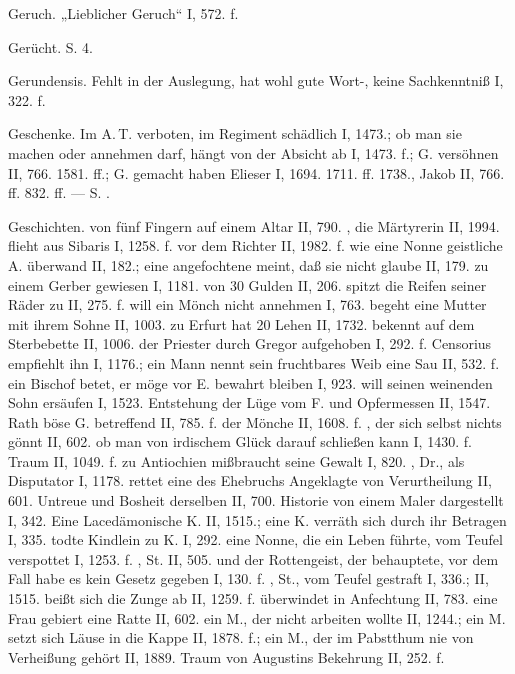 Geruch. „Lieblicher Geruch“ I, 572. f.

Gerücht. S.  4.

Gerundensis. Fehlt in der Auslegung, hat wohl gute Wort-, keine Sachkenntniß I, 322. f.

Geschenke. Im A.\,T. verboten, im Regiment schädlich I, 1473.; ob man sie machen oder annehmen darf, hängt von der Absicht ab I, 1473. f.; G. versöhnen II, 766. 1581. ff.; G. gemacht haben Elieser I, 1694. 1711. ff. 1738., Jakob II, 766. ff. 832. ff. — S. .

Geschichten.  von fünf Fingern auf einem Altar II, 790. , die Märtyrerin II, 1994.  flieht aus Sibaris I, 1258. f.  vor dem Richter II, 1982. f.  wie eine Nonne geistliche A. überwand II, 182.; eine angefochtene meint, daß sie nicht glaube II, 179.  zu einem Gerber gewiesen I, 1181.  von 30 Gulden II, 206.  spitzt die Reifen seiner Räder zu II, 275. f.  will ein Mönch nicht annehmen I, 763.  begeht eine Mutter mit ihrem Sohne II, 1003.  zu Erfurt hat 20 Lehen II, 1732.  bekennt auf dem Sterbebette II, 1006.  der Priester durch Gregor aufgehoben I, 292. f.  Censorius empfiehlt ihn I, 1176.; ein Mann nennt sein fruchtbares Weib eine Sau II, 532. f.  ein Bischof betet, er möge vor E. bewahrt bleiben I, 923.  will seinen weinenden Sohn ersäufen I, 1523.  Entstehung der Lüge vom F. und Opfermessen II, 1547.  Rath böse G. betreffend II, 785. f.  der Mönche II, 1608. f. , der sich selbst nichts gönnt II, 602.  ob man von irdischem Glück darauf schließen kann I, 1430. f.  Traum II, 1049. f.  zu Antiochien mißbraucht seine Gewalt I, 820. , Dr., als Disputator I, 1178.  rettet eine des Ehebruchs Angeklagte von Verurtheilung II, 601.  Untreue und Bosheit derselben II, 700.  Historie von einem Maler dargestellt I, 342.  Eine Lacedämonische K. II, 1515.; eine K. verräth sich durch ihr Betragen I, 335.  todte Kindlein zu K. I, 292.  eine Nonne, die ein  Leben führte, vom Teufel verspottet I, 1253. f. , St. II, 505.  und der Rottengeist, der behauptete, vor dem Fall habe es kein Gesetz gegeben I, 130. f. , St., vom Teufel gestraft I, 336.; II, 1515.  beißt sich die Zunge ab II, 1259. f.  überwindet in Anfechtung II, 783.  eine Frau gebiert eine Ratte II, 602.  ein M., der nicht arbeiten wollte II, 1244.; ein M. setzt sich Läuse in die Kappe II, 1878. f.; ein M., der im Pabstthum nie von Verheißung gehört II, 1889.  Traum von Augustins Bekehrung II, 252. f. 